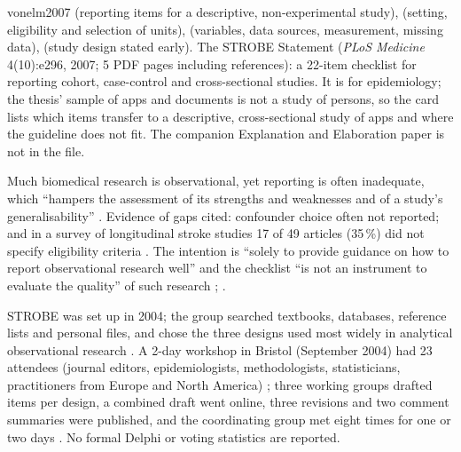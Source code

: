 \begin{papercard}{vonelm2007}
  (reporting items for a descriptive, non-experimental study),  (setting, eligibility and selection of units),  (variables, data sources, measurement, missing data),  (study design stated early). The STROBE Statement (\emph{PLoS Medicine} 4(10):e296, 2007; 5 PDF pages including references): a 22-item checklist for reporting cohort, case-control and cross-sectional studies. It is for epidemiology; the thesis' sample of apps and documents is not a study of persons, so the card lists which items transfer to a descriptive, cross-sectional study of apps and where the guideline does not fit. The companion Explanation and Elaboration paper is not in the file.

 Much biomedical research is observational, yet reporting is often inadequate, which ``hampers the assessment of its strengths and weaknesses and of a study's generalisability'' . Evidence of gaps cited: confounder choice often not reported; and in a survey of longitudinal stroke studies 17 of 49 articles (35\,\%) did not specify eligibility criteria . The intention is ``solely to provide guidance on how to report observational research well'' and the checklist ``is not an instrument to evaluate the quality'' of such research ; .

 STROBE was set up in 2004; the group searched textbooks, databases, reference lists and personal files, and chose the three designs used most widely in analytical observational research . A 2-day workshop in Bristol (September 2004) had 23 attendees (journal editors, epidemiologists, methodologists, statisticians, practitioners from Europe and North America) ; three working groups drafted items per design, a combined draft went online, three revisions and two comment summaries were published, and the coordinating group met eight times for one or two days . No formal Delphi or voting statistics are reported.


\end{papercard}
